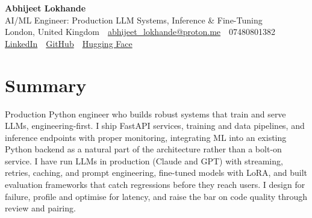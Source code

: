 \documentclass[10pt,a4paper]{article}
\newcommand{\sep}{\,\textcolor{accent!60}{\textbar}\,}
\begin{document}
\begin{center}
  {\fontsize{24}{26}\selectfont\bfseries Abhijeet Lokhande}\\[3pt]
  {\color{accent}\large AI/ML Engineer: Production LLM Systems, Inference \& Fine-Tuning}\\[5pt]
  {\small
    London, United Kingdom \sep
    \href{mailto:abhijeet_lokhande@proton.me}{abhijeet\_lokhande@proton.me} \sep
    07480801382 \\[2pt]
    \href{https://www.linkedin.com/in/ablds/}{LinkedIn} \sep
    \href{https://github.com/abhijeetscode}{GitHub} \sep
    \href{https://huggingface.co/ab-ai}{Hugging Face}
  }
\end{center}
\vspace{2pt}

\section{Summary}
Production Python engineer who builds robust systems that train and serve LLMs, engineering-first. I ship FastAPI services, training and data pipelines, and inference endpoints with proper monitoring, integrating ML into an existing Python backend as a natural part of the architecture rather than a bolt-on service. I have run LLMs in production (Claude and GPT) with streaming, retries, caching, and prompt engineering, fine-tuned models with LoRA, and built evaluation frameworks that catch regressions before they reach users. I design for failure, profile and optimise for latency, and raise the bar on code quality through review and pairing.

\end{document}
